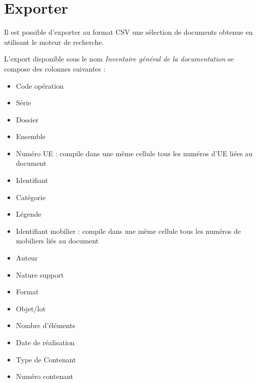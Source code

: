 \documentclass[letterpaper,10pt,french]{sphinxmanual}
\begin{document}
\section{Exporter}
\label{manuel/formulaire_documentation:exporter}
Il est possible d'exporter au format CSV une sélection de documents obtenue en utilisant le moteur de recherche.

L'export disponible sous le nom \emph{Inventaire général de la documentation} se compose des colonnes suivantes :
\begin{itemize}
\item {} 
Code opération

\item {} 
Série

\item {} 
Dossier

\item {} 
Ensemble

\item {} 
Numéro UE : compile dans une même cellule tous les numéros d'UE liées au document

\item {} 
Identifiant

\item {} 
Catégorie

\item {} 
Légende

\item {} 
Identifiant mobilier : compile dans une même cellule tous les numéros de mobiliers liés au document

\item {} 
Auteur

\item {} 
Nature support

\item {} 
Format

\item {} 
Objet/lot

\item {} 
Nombre d'éléments

\item {} 
Date de réalisation

\item {} 
Type de Contenant

\item {} 
Numéro contenant

\end{itemize}
\end{document}
